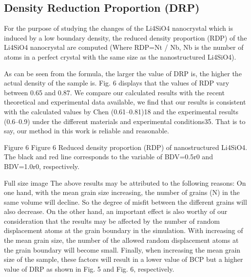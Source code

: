 \documentclass{article}
\begin{document}
\subsection{Density Reduction Proportion (DRP)}

For the purpose of studying the changes of the Li4SiO4 nanocrystal which is induced by a low boundary density, the reduced density proportion (RDP) of the Li4SiO4 nanocrystal are computed (Where RDP=Nt / Nb, Nb is the number of atoms in a perfect crystal with the same size as the nanostructured Li4SiO4).

As can be seen from the formula, the larger the value of DRP is, the higher the actual density of the sample is. Fig. 6 displays that the values of RDP vary between 0.65 and 0.87. We compare our calculated results with the recent theoretical and experimental data available, we find that our results is consistent with the calculated values by Chen (0.61–0.81)18 and the experimental results (0.6–0.9) under the different materials and experimental conditions35. That is to say, our method in this work is reliable and reasonable.

Figure 6
Figure 6
Reduced density proportion (RDP) of nanostructured Li4SiO4. The black and red line corresponds to the variable of BDV=0.5r0 and BDV=1.0r0, respectively.

Full size image
The above results may be attributed to the following reasons: On one hand, with the mean grain size increasing, the number of grains (N) in the same volume will decline. So the degree of misfit between the different grains will also decrease. On the other hand, an important effect is also worthy of our consideration that the results may be affected by the number of random displacement atoms at the grain boundary in the simulation. With increasing of the mean grain size, the number of the allowed random displacement atoms at the grain boundary will become small. Finally, when increasing the mean grain size of the sample, these factors will result in a lower value of BCP but a higher value of DRP as shown in Fig. 5 and Fig. 6, respectively.
\end{document}
